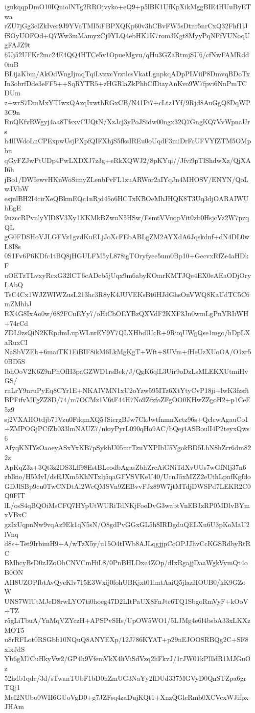 ignkqqpDmO10IQniolNTg2RROjvyko+eQ9+p5lBK1UfKpXikMggBIE4HUuByETwa
rZU7jGg3clZkIver9J9YVaTMI5iFBPXQKp60v3hCBvFW5sDtnr5nrCxQ32Fhf1lJ
fSOyUOFOd+Q7Ww3mMamyxCj9YLQ4ebHK1K7rom3Kgt8MyyPqNFfVUNoqUgFAJZ9t
6Uj52UFKr2mc24E4QQ4HTCe5v1OpueMgvu/qHu3GZaRtmjSU6/cfNwFAMRdd0iuB
BLijaKbm/AkOdWngIjmqTqiLvzxcYrztlcsVkatLgnpkqADpPLViiP8DmvqBDoTx
In3obrfDde3eFF5++SqRYTR5+zHGRlaZkPhbCfDiayAnKvo9W7fpvi6NnPmTCDUm
z+wrS7DmMxYTIwxQAzqIxwtbRGxCB/N41Pi7+cLtz1Yf/9Rjd8AuGgQ8DqWP3C9n
RnQKfvRWgyj4aa8TfsxvCUQtN/XzJcj3yPoJSidw00ngx32Q7GngKQ7VvWpnaUrs
h4lIWdoLnCPExpwUsjPXpfQIFXhjS5fksIREu0oUqdF3miDrFcUFVYfZTM5OMpbu
qGyFZJwPtUDp4PwLXDXJ7z3g+eRkXQWJ2/8pKYqi//Jfvi9pTlShdwXz/QjXAI6h
jBo1/DWIewvHKnWoSimyZLenbFvFL1zuARWor2aIYqJn4MHOSV/ENYN/QoLwJVbW
esjnlBH2I4cirXeQBkmEQc1nRjd45o6HCTxKBOeMhJHQK8T3Uq3djOARAIWUhEgE
9uzccRPvnlyYlD8V3Xy1KKMkBZwuN5HSw/EsmtVVuqpVit0zb0HsjcVz2W7pzqQL
gG0FDSHoVJLGFVz1gvdKuELjJoXcFEbABLgZM2AYXdA6Jqskdnf+dN4DL0wL8I8s
0S1Fv6P6KDfc1tBQ8jHGULFM5yL878igTOryfyee5um0Bp10+GecvxRfZe4aHDkF
uOETzTLvxyRcxG32lCT6cADcb5jUqx9m6abyKOmrKMTJQe4EX0eAEaODjOryLAbQ
TsC4Cx1WJZWlWZusL213hc3R8yK4JUVEKsBt6HJdGhsOnVWQ8KaUdTC5C6mZMhhJ
RX4G8IxAo0w/682FCuEYy7/oHiCbOEYBzQXVdF2KXF3Jn0wmLgPnYRIiWH+74rCd
ZDL9zsQiN2KRpdmLupWLnrEY9Y7QLXHbdlUcR+9RuqUWgQse1mgo/hDpLXaRuxCI
NaSbVZEb+6maiTK1EiBIF8ikM6LkMgKgT+Wft+SUVm+fHeUzXUoOA/O1zr50BD5S
lbhOoV2K6Z9nPhOfH3paGZWD1rsBek/J/QgK6qlL3Uir9oDzLsMLEKXUtmiHvGS/
rnLrY9nruPyEq8CYr1E+NKAIVMN1xU2oYzw595ITz6XtYtyCvP18ji+lwK3fzsft
BPFifvMFgZZ8D/74/m7OCMz1V6tF44H7No9ZfzfoZFgOO0KHwZZgoH2+p1CeE5z9
sj2VXAHOtdjb71Vzu0FdqmXQ5JSicrgBJw7CkJwtfnmnXctz96s+QclcwAgauCo1
+ZMPOGjPCfZb033lmNAUZ7/nkiyPyrL090qHo9AC/bQej4ASBoulI4P2teyxQws6
AfyqKNIYsOaoeyASxYxKB7pSykbU05mrTzuYXPIbU5YgokBD5LhN8hZrr6dm822z
ApKqZ3z+3Qt3z2DS3Lff98EstBLeodbAgasZbhZrcAiGNiTdXvUUs7wGfNIj37n6
zblkio/H5MvI/dsEJXm5KhNTxlj5qaGFVSVKeU40/UcnJ5xMZZ2eUthLpnfKgfdo
GDJlSBp9cu0TwCNDtAl2WcQMSVn9ZEBvvFJz89W7jtMTdjDWSPd7LEKR2C0Q0FIT
lL/osS4qBQOiMsCFQ7HYpUtWURiTdNKjFoeDvG3wabtVnEBJzRP0MDlvBYmxVBxC
gzIxUqpnNw9vqAz9Ek1qN5sN/O8gdPvGGxGL5h8IRDgduQELXu6U3pKoMaU2lVnq
d8s+Tet9IrbimH9+A/wTzX5y/u15O4tIWb8AJLqgjjpCcOPJJhvCcKGSRdbyRtRC
BMhcyBsD0zJZoOhCNVCmHiL8/0PnBHLDxc4ZOp/dIxRgajjDaaWgkVymQt4oB0ON
AH8UZOPfbtAvQyeKlv715E3Wxij0fohUBKjxt01lmtAaiQ5jlazHOUB0/kK9GZoW
UNS7WlUtMJeD8rwLYO7ti0hoeg47D2LItPaUX8FnJtc6TQ1SbgoRmVyF+kOoV+TZ
r5gLiTbuA/YnMqVZYczH+APSPvSHs/UpOW5WO1/5LJMg4e6l4bsbA33xLKXzMOT5
u8rRFLot0RSGbb10NQuQ8ANYEXp/12J786KYAT+p29nEJOOSRBQg2C+SF8xlxJdS
Yb6gM7CuHkyVw2/GP4h9VfemVkX4liViSdVzq2hFkvJ/1rJW01kPllldR1MJGuOz
52hdb1qdc/3d/sTwanTUbF1bD0hZmUG3NaYy2fDUd337MGVyD0QnSTZpa6grTQj1
MeI2NUbo0WH6GUoVgD0+g7JZFsq4zaDujKQt1+XnzQGlcRmb0XCVcxWJifpxJHAm
